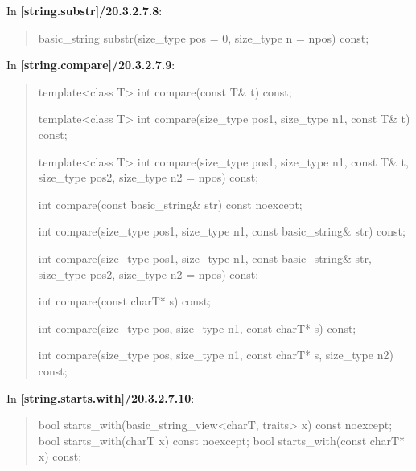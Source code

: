 \documentclass{wg21}
\begin{document}
In \textbf{[string.substr]/20.3.2.7.8}:
\begin{quote}
\begin{itemdecl}
basic_string substr(size_type pos = 0, size_type n = npos) const;
\end{itemdecl}
\end{quote}

In \textbf{[string.compare]/20.3.2.7.9}:
\begin{quote}
\begin{itemdecl}
template<class T>
  int compare(const T& t) const;
\end{itemdecl}

\begin{itemdecl}
template<class T>
  int compare(size_type pos1, size_type n1, const T& t) const;
\end{itemdecl}

\begin{itemdecl}
template<class T>
  int compare(size_type pos1, size_type n1, const T& t, size_type pos2, size_type n2 = npos) const;
\end{itemdecl}

\begin{itemdecl}
int compare(const basic_string& str) const noexcept;
\end{itemdecl}

\begin{itemdecl}
int compare(size_type pos1, size_type n1, const basic_string& str) const;
\end{itemdecl}

\begin{itemdecl}
int compare(size_type pos1, size_type n1, const basic_string& str,
            size_type pos2, size_type n2 = npos) const;
\end{itemdecl}

\begin{itemdecl}
int compare(const charT* s) const;
\end{itemdecl}

\begin{itemdecl}
int compare(size_type pos, size_type n1, const charT* s) const;
\end{itemdecl}

\begin{itemdecl}
int compare(size_type pos, size_type n1, const charT* s, size_type n2) const;
\end{itemdecl}
\end{quote}

In \textbf{[string.starts.with]/20.3.2.7.10}:
\begin{quote}
\begin{itemdecl}
bool starts_with(basic_string_view<charT, traits> x) const noexcept;
bool starts_with(charT x) const noexcept;
bool starts_with(const charT* x) const;
\end{itemdecl}
\end{quote}
\end{document}
